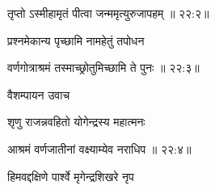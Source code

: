 
{\devanagarifont तृप्तो ऽस्मीहामृतं पीत्वा जन्ममृत्युरुजापहम् {॥ २२:२॥} \veg\dontdisplaylinenum }%

{\devanagarifont प्रश्नमेकान्य पृच्छामि नामहेतुं तपोधन \thinspace{\dandab} \dontdisplaylinenum }%


{\devanagarifont वर्णगोत्राश्रमं तस्माच्छ्रोतुमिच्छामि ते पुनः {॥ २२:३॥} \veg\dontdisplaylinenum }%

{\devanagarifont वैशम्पायन उवाच {\dandab}\dontdisplaylinenum  }%

{\devanagarifont शृणु राजन्नवहितो योगेन्द्रस्य महात्मनः \thinspace{\danda} \dontdisplaylinenum }%


{\devanagarifont आश्रमं वर्णजातीनां वक्ष्याम्येव नराधिप {॥ २२:४॥} \veg\dontdisplaylinenum }%

{\devanagarifont हिमवद्दक्षिणे पार्श्वे मृगेन्द्रशिखरे नृप \thinspace{\dandab} \dontdisplaylinenum }%

